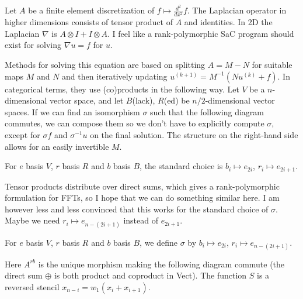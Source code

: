 \documentclass{article}
\begin{document}
\newpage

Let $A$ be a finite element discretization of $f \mapsto \frac{d^2}{d x^2} f$.
The Laplacian operator in higher dimensions consists of tensor product of $A$ 
and identities. In 2D the Laplacian $\nabla$ is $A \otimes I + I \otimes A$. 
I feel like a rank-polymorphic SaC program should exist for solving 
$\nabla u = f$ for $u$.

Methods for solving this equation are based on splitting $A = M - N$ for 
suitable maps $M$ and $N$ and then iteratively updating 
$u^{(k + 1)} = M^{-1}(Nu^{(k)} + f)$. In categorical terms, they use (co)products
in the following way. Let $V$ be a $n$-dimensional vector space, 
and let $B$(lack), $R$(ed) be $n / 2$-dimensional vector spaces. If we can find
an isomorphism $\sigma$ such that the following diagram commutes,
we can compose them so we don't have to explicitly compute $\sigma$, except for
$\sigma f$ and $\sigma^{-1}u$ on the final solution. The structure on the
right-hand side allows for an easily invertible $M$.


For $e$ basis $V$, $r$ basis $R$ and $b$ basis $B$, the standard choice is
$b_i \mapsto e_{2i}$, $r_i \mapsto e_{2i + 1}$. 

Tensor products distribute over direct sums, which gives a rank-polymorphic
formulation for FFTs, so I hope that we can do something similar here. I am
however less and less convinced that this works for the standard choice of 
$\sigma$. Maybe we need $r_i \mapsto e_{n - (2i + 1)}$ instead of $e_{2i + 1}$.

\newpage

For $e$ basis $V$, $r$ basis $R$ and $b$ basis $B$, we define $\sigma$ by
$b_i \mapsto e_{2i}$, $r_i \mapsto e_{n - (2i + 1)}$. 


Here $A^{rb}$ is the unique morphism making the following diagram commute
(the direct sum $\oplus$ is both product and coproduct in Vect).
The function $S$ is a reversed stencil $x_{n - i} = w_1 (x_i + x_{i + 1})$.
\end{document}
